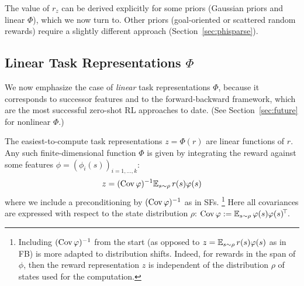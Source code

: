 \documentclass[11pt,a4paper]{article}
\begin{document}
% 

The value of $r_z$ can be derived explicitly for some priors (Gaussian
priors and linear $\Phi$), which we now turn to. Other priors
(goal-oriented or scattered
random rewards) require a slightly different approach
(Section~\ref{sec:phisparse}).

\subsection{Linear Task Representations $\Phi$}
\label{sec:SF}

We now emphasize the case of \emph{linear} task representations
$\Phi$, because it corresponds to successor features and to the
forward-backward framework, which are the most successful zero-shot RL
approaches to date. (See Section~\ref{sec:future} for nonlinear $\Phi$.)

The easiest-to-compute
task representations $z=\Phi(r)$ are linear functions of $r$. Any such
finite-dimensional function $\Phi$ is given by integrating
the reward against some features $\phi=(\phi_{i}(s))_{i=1,\ldots,k}$:
\begin{equation}
z=(\operatorname{Cov} \varphi)^{-1} \mathbb{E}_{s\sim \rho} \,r(s)\varphi(s)
\end{equation}
where we include a preconditioning by $(\operatorname{Cov} \varphi)^{-1}$ as in SFs. \footnote{
Including $(\operatorname{Cov} \varphi)^{-1}$ from the start (as opposed to
$z=\mathbb{E}_{s\sim \rho} \,r(s)\varphi(s)$ as in FB) is more adapted to
distribution shifts. Indeed, for rewards in the span of
$\phi$, then the reward representation 
$z$ is independent of the distribution $\rho$ of states used for the
computation.
} 
Here all covariances are expressed with respect to the state
distribution $\rho$: $\operatorname{Cov} \varphi\mathrel{\mathop{:}}= \mathbb{E}_{s\sim \rho} \,\varphi(s)\varphi(s)^{\!\top}\!$.
\end{document}
